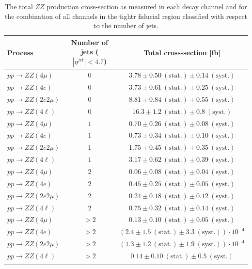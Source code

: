  \begin{table}[htbH]
\begin{center}
\caption{\footnotesize{The total $ZZ$ production cross-section as measured in each decay channel and for the combination of all channels in the tightr fiducial region classified with respect to the number of jets.}}
\label{tab:xs_njets_fr}
\begin{tabular}{lcc}
\hline Process & Number of jets ($|\eta^{jet}|<4.7$) &  Total cross-section [fb]\\
\hline $pp\to ZZ(4\mu) $ & $ 0 $ & $3.78\pm 0.50~\mathrm{(stat.)}\pm 0.14~\mathrm{(syst.)}$\\
$pp\to ZZ(4e) $ & $  0 $ & $3.73\pm 0.61~\mathrm{(stat.)}\pm 0.25~\mathrm{(syst.)}$\\
$pp\to ZZ(2e2\mu)$ & $ 0 $ &  $8.81\pm 0.84~\mathrm{(stat.)}\pm 0.55~\mathrm{(syst.)}$\\
\hline
\textbf{$pp\to ZZ(4\ell)$} & $0$ & $16.3 \pm 1.2~\mathrm{(stat.)}\pm 0.8~\mathrm{(syst.)}$ \\
\hline
$pp\to ZZ(4\mu) $ & $1$ & $0.70\pm 0.26~\mathrm{(stat.)}\pm 0.08~\mathrm{(syst.)}$\\
$pp\to ZZ(4e) $ &  $1$ & $0.73\pm 0.34~\mathrm{(stat.)}\pm 0.10~\mathrm{(syst.)}$\\
$pp\to ZZ(2e2\mu)$ & $1$ & $1.75\pm 0.45~\mathrm{(stat.)}\pm 0.35~\mathrm{(syst.)}$\\
\hline
\textbf{$pp\to ZZ(4\ell)$} & $1$ & $3.17 \pm 0.62~\mathrm{(stat.)}\pm 0.39~\mathrm{(syst.)}$ \\
\hline 
$pp\to ZZ(4\mu) $ & $2$ & $0.06\pm 0.08~\mathrm{(stat.)}\pm 0.04~\mathrm{(syst.)}$\\
$pp\to ZZ(4e) $ &  $2$ & $0.45\pm 0.25~\mathrm{(stat.)}\pm 0.05~\mathrm{(syst.)}$\\
$pp\to ZZ(2e2\mu)$ & $2$ & $0.24\pm 0.18~\mathrm{(stat.)}\pm 0.12~\mathrm{(syst.)}$\\
\hline
\textbf{$pp\to ZZ(4\ell)$} & $2$ & $0.75 \pm 0.32~\mathrm{(stat.)}\pm 0.14~\mathrm{(syst.)}$ \\
\hline 
$pp\to ZZ(4\mu) $ & $>2$ & $0.13\pm 0.10~\mathrm{(stat.)}\pm 0.05~\mathrm{(syst.)}$\\
$pp\to ZZ(4e) $ & $>2$ & $(2.4\pm 1.5~\mathrm{(stat.)}\pm 3.3~\mathrm{(syst.)}) \cdot 10^{-4}$\\
$pp\to ZZ(2e2\mu)$ & $>2$ & $(1.3 \pm 1.2~\mathrm{(stat.)}\pm 1.9~\mathrm{(syst.)})\cdot 10^{-4}$\\
\hline
\textbf{$pp\to ZZ(4\ell)$} & $>2$ & $0.14\pm 0.10~\mathrm{(stat.)} \pm 0.5~\mathrm{(syst.)}$ \\
\hline \\
\end{tabular}%
\end{center}
\end{table}



